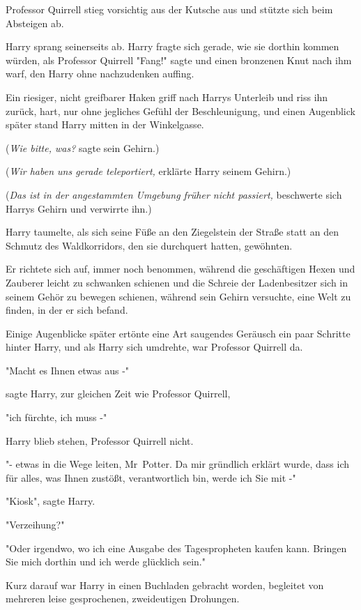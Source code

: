 {Professor Quirrell stieg vorsichtig aus der Kutsche aus und stützte sich beim Absteigen ab.

Harry sprang seinerseits ab. Harry fragte sich gerade, wie sie dorthin kommen würden, als Professor Quirrell "Fang!" sagte und einen bronzenen Knut nach ihm warf, den Harry ohne nachzudenken auffing.

Ein riesiger, nicht greifbarer Haken griff nach Harrys Unterleib und riss ihn zurück, hart, nur ohne jegliches Gefühl der Beschleunigung, und einen Augenblick später stand Harry mitten in der Winkelgasse.

(\emph{Wie bitte, was?} sagte sein Gehirn.)

(\emph{Wir haben uns gerade teleportiert,} erklärte Harry seinem Gehirn.)

(\emph{Das ist in der angestammten Umgebung früher nicht passiert,} beschwerte sich Harrys Gehirn und verwirrte ihn.)

Harry taumelte, als sich seine Füße an den Ziegelstein der Straße statt an den Schmutz des Waldkorridors, den sie durchquert hatten, gewöhnten.

Er richtete sich auf, immer noch benommen, während die geschäftigen Hexen und Zauberer leicht zu schwanken schienen und die Schreie der Ladenbesitzer sich in seinem Gehör zu bewegen schienen, während sein Gehirn versuchte, eine Welt zu finden, in der er sich befand.

Einige Augenblicke später ertönte eine Art saugendes Geräusch ein paar Schritte hinter Harry, und als Harry sich umdrehte, war Professor Quirrell da.

"Macht es Ihnen etwas aus -"

sagte Harry, zur gleichen Zeit wie Professor Quirrell,

"ich fürchte, ich muss -"

Harry blieb stehen, Professor Quirrell nicht.

"- etwas in die Wege leiten, Mr~Potter. Da mir gründlich erklärt wurde, dass ich für alles, was Ihnen zustößt, verantwortlich bin, werde ich Sie mit -"

"Kiosk", sagte Harry.

"Verzeihung?"

"Oder irgendwo, wo ich eine Ausgabe des Tagespropheten kaufen kann. Bringen Sie mich dorthin und ich werde glücklich sein."

Kurz darauf war Harry in einen Buchladen gebracht worden, begleitet von mehreren leise gesprochenen, zweideutigen Drohungen.

}
